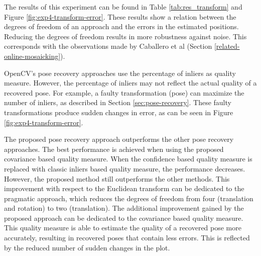 The results of this experiment can be found in Table \ref{tab:res_transform} and Figure \ref{fig:exp4-transform-error}.
These results show a relation between the degrees of freedom of an approach and the errors in the estimated positions.
Reducing the degrees of freedom results in more robustness against noise.
This corresponds with the observations made by Caballero et al (Section \ref{related-online-mosaicking}).

OpenCV's pose recovery approaches use the percentage of inliers as quality measure.
However, the percentage of inliers may not reflect the actual quality of a recovered pose.
For example, a faulty transformation (pose) can maximize the number of inliers, as described in Section \ref{sec:pose-recovery}.
These faulty transformations produce sudden changes in error, as can be seen in Figure \ref{fig:exp4-transform-error}.

The proposed pose recovery approach outperforms the other pose recovery approaches.
The best performance is achieved when using the proposed covariance based quality measure.
When the confidence based quality measure is replaced with classic inliers based quality measure, the performance decreases.
However, the proposed method still outperforms the other methods.
This improvement with respect to the Euclidean transform can be dedicated to the pragmatic approach, which reduces the degrees of freedom from four (translation and rotation) to two (translation).
The additional improvement gained by the proposed approach can be dedicated to the covariance based quality measure.
This quality measure is able to estimate the quality of a recovered pose more accurately, resulting in recovered poses that contain less errors.
This is reflected by the reduced number of sudden changes in the plot.



